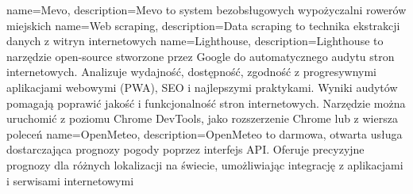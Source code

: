 {
    name={Mevo},
    description={Mevo to system bezobsługowych wypożyczalni rowerów miejskich}
}
{
    name={Web scraping},
    description={Data scraping to technika ekstrakcji danych z witryn internetowych}
}
{
    name={Lighthouse},
    description={Lighthouse to narzędzie open-source stworzone przez Google do automatycznego audytu stron internetowych. Analizuje wydajność, dostępność, zgodność z progresywnymi aplikacjami webowymi (PWA), SEO i najlepszymi praktykami. Wyniki audytów pomagają poprawić jakość i funkcjonalność stron internetowych. Narzędzie można uruchomić z poziomu Chrome DevTools, jako rozszerzenie Chrome lub z wiersza poleceń}
}
{
    name={OpenMeteo},
    description={OpenMeteo to darmowa, otwarta usługa dostarczająca prognozy pogody poprzez interfejs API. Oferuje precyzyjne prognozy dla różnych lokalizacji na świecie, umożliwiając integrację z aplikacjami i serwisami internetowymi}
}

